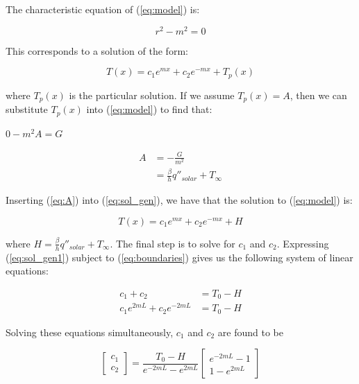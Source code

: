 \documentclass[]{article}
\begin{document}
The characteristic equation of (\ref{eq:model}) is:

\begin{equation}
r^2 - m^2  = 0
\end{equation}

This corresponds to a solution of the form:

\begin{equation} \label{eq:sol_gen}
T(x) = c_1 e^{mx} + c_2 e^{-mx} + T_p(x)
\end{equation}

where $T_p(x)$ is the particular solution. If we assume $T_p(x) = A$, then we can substitute $T_p(x)$ into (\ref{eq:model}) to find that:

\begin{center}
$0 - m^2 A = G$ 
\end{center}
\begin{equation} \label{eq:A}
\begin{split}
A & = -\frac{G}{m^2} \\
& = \frac{\beta}{h}q''_{solar} + T_{\infty}
\end{split}
\end{equation}

Inserting (\ref{eq:A}) into (\ref{eq:sol_gen}), we have that the solution to (\ref{eq:model}) is:

\begin{equation} \label{eq:sol_gen1}
T(x) = c_1 e^{mx} + c_2 e^{-mx} + H
\end{equation}

where $H = \frac{\beta}{h}q''_{solar} + T_{\infty}$. The final step is to solve for $c_1$ and $c_2$. Expressing (\ref{eq:sol_gen1}) subject to (\ref{eq:boundaries}) gives us the following system of linear equations:

\begin{align*}
c_1 + c_2 & = T_0 - H \\
c_1 e^{2mL} + c_2 e^{-2mL} & = T_0 - H
\end{align*}

Solving these equations simultaneously, $c_1$ and $c_2$ are found to be

\begin{equation*}
\begin{bmatrix}
c_1\\
c_2
\end{bmatrix} = \frac{T_0 - H}{e^{-2mL} - e^{2mL}} \begin{bmatrix}
e^{-2mL}-1 \\
1-e^{2mL}
\end{bmatrix}
\end{equation*}
\end{document}

